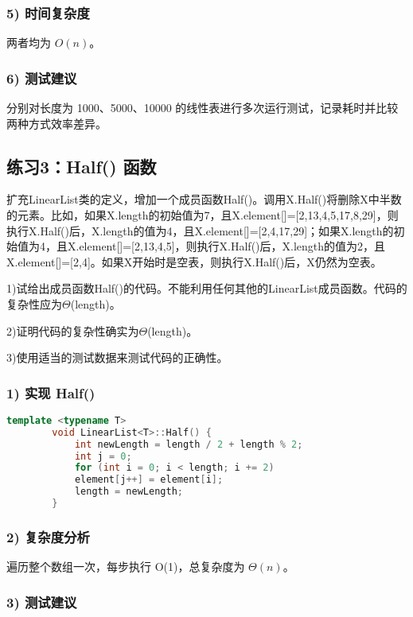 \documentclass[UTF8]{ctexart}
\begin{document}
	\subsubsection{5) 时间复杂度}
	
	两者均为 $ O(n) $。
	\subsubsection{6) 测试建议}
	
	分别对长度为 1000、5000、10000 的线性表进行多次运行测试，记录耗时并比较两种方式效率差异。
	\subsection{练习3：Half() 函数}
	
	扩充LinearList类的定义，增加一个成员函数Half()。调用X.Half()将删除X中半数的元素。比如，如果X.length的初始值为7，且X.element[]=[2,13,4,5,17,8,29]，则执行X.Half()后，X.length的值为4，且X.element[]=[2,4,17,29]；如果X.length的初始值为4，且X.element[]=[2,13,4,5]，则执行X.Half()后，X.length的值为2，且X.element[]=[2,4]。如果X开始时是空表，则执行X.Half()后，X仍然为空表。
	
	1)试给出成员函数Half()的代码。不能利用任何其他的LinearList成员函数。代码的复杂性应为$\Theta$(length)。
	
	2)证明代码的复杂性确实为$\Theta$(length)。
	
	3)使用适当的测试数据来测试代码的正确性。
	
	\subsubsection{1) 实现 Half()}
	
	\begin{lstlisting}[language=C++]
		template <typename T>
		void LinearList<T>::Half() {
			int newLength = length / 2 + length % 2;
			int j = 0;
			for (int i = 0; i < length; i += 2)
			element[j++] = element[i];
			length = newLength;
		}
	\end{lstlisting}
	\subsubsection{2) 复杂度分析}
	
	遍历整个数组一次，每步执行 O(1)，总复杂度为 $ \Theta(n) $。
	\subsubsection{3) 测试建议}
	
\end{document}
